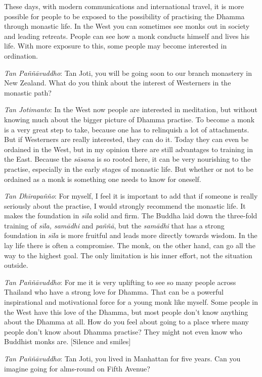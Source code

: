 These days, with modern communications and international travel, it is
more possible for people to be exposed to the possibility of practising
the Dhamma through monastic life. In the West you can sometimes see
monks out in society and leading retreats. People can see how a monk
conducts himself and lives his life. With more exposure to this, some
people may become interested in ordination. 

\emph{Tan Paññāvuddho}: Tan Joti, you will be going soon to our branch
monastery in New Zealand. What do you think about the interest of
Westerners in the monastic path? 

\emph{Tan Jotimanto}: In the West now people are interested in
meditation, but without knowing much about the bigger picture of Dhamma
practise. To become a monk is a very great step to take, because one has
to relinquish a lot of attachments. But if Westerners are really
interested, they can do it. Today they can even be ordained in the West, 
but in my opinion there are still advantages to training in the East. 
Because the \emph{sāsana} is so rooted here, it can be very nourishing
to the practise, especially in the early stages of monastic life. But
whether or not to be ordained as a monk is something one needs to know
for oneself. 

\emph{Tan Dhīrapañño}: For myself, I feel it is important to add that
if someone is really seriously about the practise, I would strongly
recommend the monastic life. It makes the foundation in \emph{sīla}
solid and firm. The Buddha laid down the three-fold training of
\emph{sīla, samādhi} and \emph{paññā}, but the \emph{samādhi} that has a
strong foundation in \emph{sīla} is more fruitful and leads more
directly towards wisdom. In the lay life there is often a compromise. 
The monk, on the other hand, can go all the way to the highest goal. The
only limitation is his inner effort, not the situation outside. 

\emph{Tan Paññāvuddho}: For me it is very uplifting to see so many
people across Thailand who have a strong love for Dhamma. That can be a
powerful inspirational and motivational force for a young monk like
myself. Some people in the West have this love of the Dhamma, but most
people don't know anything about the Dhamma at all. How do you feel
about going to a place where many people don't know about Dhamma
practise? They might not even know who Buddhist monks are. [Silence and smiles]

\emph{Tan Paññāvuddho}: Tan Joti, you lived in Manhattan for five
years. Can you imagine going for alms-round on Fifth Avenue? 

